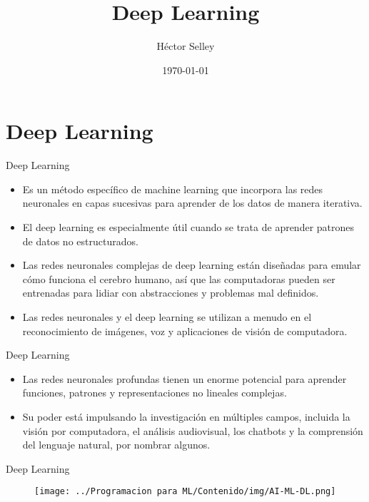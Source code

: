 \documentclass[11pt,aspectratio=169]{beamer}
\author{Héctor Selley}
\title{Deep Learning}
\institute{Universidad Anáhuac México}
\date{\today}
\begin{document}

\begin{frame}
	\titlepage
\end{frame}


\section{Deep Learning}
\begin{frame}{Deep Learning}
\begin{itemize}
	\item Es un método específico de machine learning que incorpora las redes neuronales en capas sucesivas para aprender de los datos de
		manera iterativa.\pause
	\item El deep learning es especialmente útil cuando se trata de aprender patrones de datos no estructurados.\pause
	\item Las redes neuronales complejas de deep learning están diseñadas para emular cómo funciona el cerebro humano, así que las computadoras 
		pueden ser entrenadas para lidiar con abstracciones y problemas mal definidos.\pause
	\item Las redes neuronales y el deep learning se utilizan a menudo en el reconocimiento de imágenes, voz y aplicaciones de visión de computadora.
\end{itemize}
\end{frame}

\begin{frame}{Deep Learning}
\begin{itemize}
	\item Las redes neuronales profundas tienen un enorme potencial para aprender funciones, patrones y representaciones no lineales complejas.\pause
	\item Su poder está impulsando la investigación en múltiples campos, incluida la visión por computadora, el análisis audiovisual, los chatbots 
		y la comprensión del lenguaje natural, por nombrar algunos.
\end{itemize}
\end{frame}

\begin{frame}{Deep Learning}
\begin{figure}[H]
	\centering
	\texttt{[image: ../Programacion para ML/Contenido/img/AI-ML-DL.png]} %
\end{figure}
\end{frame}
\end{document}

